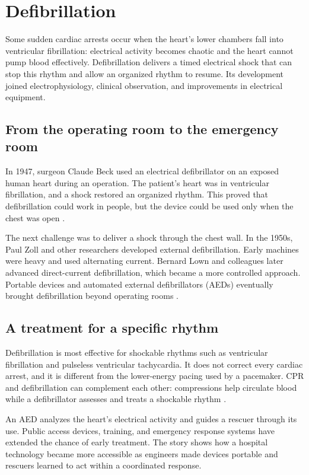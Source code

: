 \documentclass[12pt,oneside]{book}
\begin{document}
\chapter[Defibrillation]{Defibrillation}

Some sudden cardiac arrests occur when the heart's lower chambers fall
into ventricular fibrillation: electrical activity becomes chaotic and the
heart cannot pump blood effectively. Defibrillation delivers a timed
electrical shock that can stop this rhythm and allow an organized rhythm
to resume. Its development joined electrophysiology, clinical observation,
and improvements in electrical equipment.

\section{From the operating room to the emergency room}
In 1947, surgeon Claude Beck used an electrical defibrillator on an
exposed human heart during an operation. The patient's heart was in
ventricular fibrillation, and a shock restored an organized rhythm. This
proved that defibrillation could work in people, but the device could be
used only when the chest was open \cite{defibrillationHistory}.

The next challenge was to deliver a shock through the chest wall. In the
1950s, Paul Zoll and other researchers developed external defibrillation.
Early machines were heavy and used alternating current. Bernard Lown and
colleagues later advanced direct-current defibrillation, which became a
more controlled approach. Portable devices and automated external
defibrillators (AEDs) eventually brought defibrillation beyond operating
rooms \cite{ahaCprHistory,defibrillationHistory}.

\section{A treatment for a specific rhythm}
Defibrillation is most effective for shockable rhythms such as ventricular
fibrillation and pulseless ventricular tachycardia. It does not correct
every cardiac arrest, and it is different from the lower-energy pacing
used by a pacemaker. CPR and defibrillation can complement each other:
compressions help circulate blood while a defibrillator assesses and treats
a shockable rhythm \cite{ahaCprHistory}.

An AED analyzes the heart's electrical activity and guides a rescuer
through its use. Public access devices, training, and emergency response
systems have extended the chance of early treatment. The story shows how
a hospital technology became more accessible as engineers made devices
portable and rescuers learned to act within a coordinated response.
\end{document}

